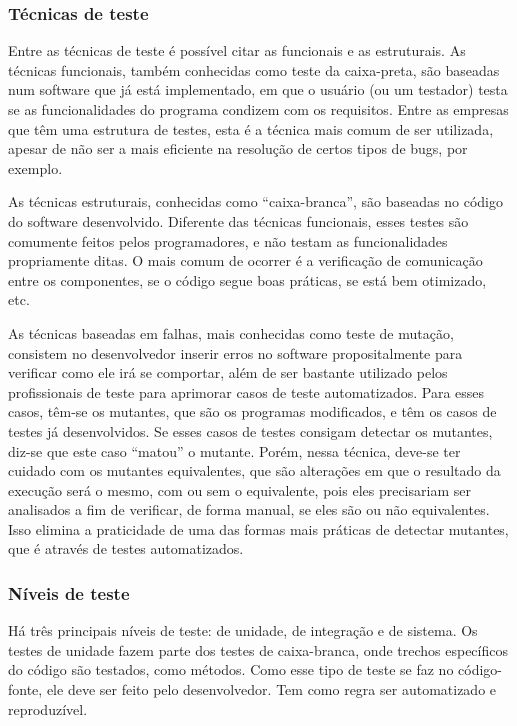 \documentclass[twoside,english,brazilian]{UNISINOSartigo}
\begin{document}
\subsubsection{Técnicas de teste}
Entre as técnicas de teste é possível citar as funcionais e as estruturais. As técnicas funcionais, também conhecidas como teste da caixa-preta, são baseadas num software que já está implementado, em que o usuário (ou um testador) testa se as funcionalidades do programa condizem com os requisitos. Entre as empresas que têm uma estrutura de testes, esta é a técnica mais comum de ser utilizada, apesar de não ser a mais eficiente na resolução de certos tipos de bugs, por exemplo. 

As técnicas estruturais, conhecidas como ``caixa-branca'', são baseadas no código do software desenvolvido. Diferente das técnicas funcionais, esses testes são comumente feitos pelos programadores, e não testam as funcionalidades propriamente ditas. O mais comum de ocorrer é a verificação de comunicação entre os componentes, se o código segue boas práticas, se está bem otimizado, etc.  

As técnicas baseadas em falhas, mais conhecidas como teste de mutação, consistem no desenvolvedor inserir erros no software propositalmente para verificar como ele irá se comportar, além de ser bastante utilizado pelos profissionais de teste para aprimorar casos de teste automatizados. Para esses casos, têm-se os mutantes, que são os programas modificados, e têm os casos de testes já desenvolvidos. Se esses casos de testes consigam detectar os mutantes, diz-se que este caso ``matou'' o mutante. Porém, nessa técnica, deve-se ter cuidado com os mutantes equivalentes, que são alterações em que o resultado da execução será o mesmo, com ou sem o equivalente, pois eles precisariam ser analisados a fim de verificar, de forma manual, se eles são ou não equivalentes. Isso elimina a praticidade de uma das formas mais práticas de detectar mutantes, que é através de testes automatizados. 


\subsubsection{Níveis de teste}
Há três principais níveis de teste: de unidade, de integração e de sistema. Os testes de unidade fazem parte dos testes de caixa-branca, onde trechos específicos do código são testados, como métodos. Como esse tipo de teste se faz no código-fonte, ele deve ser feito pelo desenvolvedor. Tem como regra ser automatizado e reproduzível.
\end{document}
